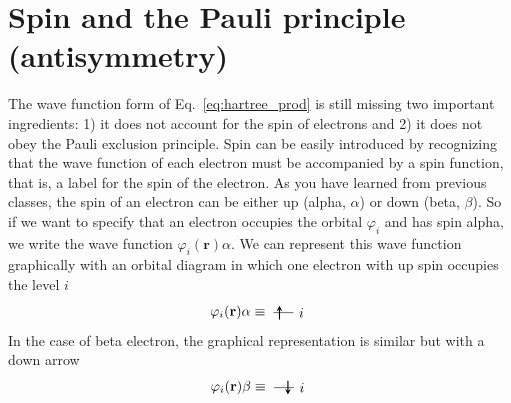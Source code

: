\documentclass[../Main/chem371-notes.tex]{subfiles}
\begin{document}
\section{Spin and the Pauli principle (antisymmetry)}
The wave function form of Eq.~\eqref{eq:hartree_prod} is still missing two important ingredients: 1) it does not account for the spin of electrons and 2) it does not obey the Pauli exclusion principle.
Spin can be easily introduced by recognizing that the wave function of each electron must be accompanied by a spin function, that is, a label for the spin of the electron.
As you have learned from previous classes, the spin of an electron can be either up (alpha, $\alpha$) or down (beta, $\beta$).
So if we want to specify that an electron occupies the orbital $\varphi_i$ and has spin alpha, we write the wave function $\varphi_i(\mathbf{r}) \alpha$.
We can represent this wave function graphically with an orbital diagram in which one electron with up spin occupies the level $i$
\begin{equation}
\varphi_i(\mathbf{r}) \alpha
\equiv \;
\begin{tikzpicture}[baseline={([yshift=-.5ex]current bounding box.center)},]
    \draw (0,0.5) -- (0.5,0.5);
    \draw[thick,->,>=stealth] (0.15,0.325) -- (0.15,0.675);
    \draw (0.7,0.5) node{$i$};
\end{tikzpicture}
\end{equation}
In the case of beta electron, the graphical representation is similar but with a down arrow
\begin{equation}
\varphi_i(\mathbf{r}) \beta
\equiv \;
\begin{tikzpicture}[baseline={([yshift=-.5ex]current bounding box.center)},]
    \draw (0,0.5) -- (0.5,0.5);
    \draw[thick,<-,>=stealth] (0.35,0.325) -- (0.35,0.675);
    \draw (0.7,0.5) node{$i$};
\end{tikzpicture}
\end{equation}
\end{document}
